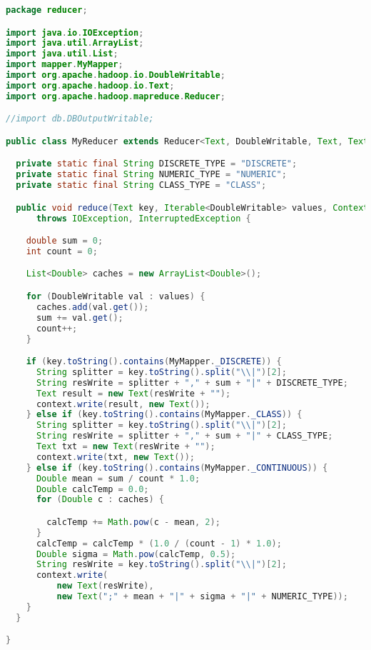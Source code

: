 \begin{lstlisting}[language=Java,basicstyle=\tiny,caption=MyReducer.java]
package reducer;

import java.io.IOException;
import java.util.ArrayList;
import java.util.List;
import mapper.MyMapper;
import org.apache.hadoop.io.DoubleWritable;
import org.apache.hadoop.io.Text;
import org.apache.hadoop.mapreduce.Reducer;

//import db.DBOutputWritable;

public class MyReducer extends Reducer<Text, DoubleWritable, Text, Text> {

  private static final String DISCRETE_TYPE = "DISCRETE";
  private static final String NUMERIC_TYPE = "NUMERIC";
  private static final String CLASS_TYPE = "CLASS";

  public void reduce(Text key, Iterable<DoubleWritable> values, Context context)
      throws IOException, InterruptedException {

    double sum = 0;
    int count = 0;

    List<Double> caches = new ArrayList<Double>();

    for (DoubleWritable val : values) {
      caches.add(val.get());
      sum += val.get();
      count++;
    }

    if (key.toString().contains(MyMapper._DISCRETE)) {
      String splitter = key.toString().split("\\|")[2];
      String resWrite = splitter + "," + sum + "|" + DISCRETE_TYPE;
      Text result = new Text(resWrite + "");
      context.write(result, new Text());
    } else if (key.toString().contains(MyMapper._CLASS)) {
      String splitter = key.toString().split("\\|")[2];
      String resWrite = splitter + "," + sum + "|" + CLASS_TYPE;
      Text txt = new Text(resWrite + "");
      context.write(txt, new Text());
    } else if (key.toString().contains(MyMapper._CONTINUOUS)) {
      Double mean = sum / count * 1.0;
      Double calcTemp = 0.0;
      for (Double c : caches) {

        calcTemp += Math.pow(c - mean, 2);
      }
      calcTemp = calcTemp * (1.0 / (count - 1) * 1.0);
      Double sigma = Math.pow(calcTemp, 0.5);
      String resWrite = key.toString().split("\\|")[2];
      context.write(
          new Text(resWrite),
          new Text(";" + mean + "|" + sigma + "|" + NUMERIC_TYPE));
    }
  }

}
\end{lstlisting}



